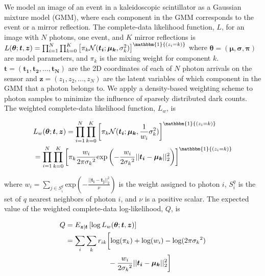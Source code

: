 We model an image of an event in a kaleidoscopic scintillator as a Gaussian 
mixture model (GMM), where each component in the GMM corresponds to the event or a 
mirror reflection.
The complete-data likelihood function, $L$, for an image with $N$ photons, 
one event, and $K$ mirror reflections is
$L(\bm{\theta};\bm{t},\bm{z})=\prod_{i=1}^N \prod_{k=0}^K \left[ \pi_k \mathcal{N}(\bm{t_i};\bm{\mu_k},\sigma_k^2) \right]^{\mathbbm{1}{(z_i=k)}}$
where $\bm{\theta}=(\bm{\mu},\bm{\sigma},\bm{\pi})$ are model parameters, 
and $\pi_k$ is the mixing weight for component $k$.
$\bm{t}=(\bm{t_1}, \bm{t_2}, ..., \bm{t_N})$ are the 2D coordinates of each of 
$N$ photon arrivals on the sensor and $\bm{z}=(z_1, z_2, ..., z_N)$ are the latent 
variables of which component in the GMM that a photon belongs to.
We apply a density-based weighting scheme to photon samples to minimize the 
influence of sparsely distributed dark counts.
The weighted complete-data likelihood function, $L_w$, is
\begin{linenomath}
\begin{align}
&L_w(\bm{\theta};\bm{t},\bm{z}) = \prod_{i=1}^N \prod_{k=0}^K \left[ \pi_k \mathcal{N}(\bm{t_i};\bm{\mu_k},\frac{1}{w_i}\sigma_k^2) \right]^{\mathbbm{1}{(z_i=k)}} \\
&= \prod_{i=1}^N \prod_{k=0}^K \left[ \pi_k \frac{w_i}{2\pi{\sigma_k}^2} \text{exp}\left( -\frac{w_i}{2{\sigma_k}^2} ||\bm{t_i}-\bm{\mu_k}||_2^2 \right) \right]^{\mathbbm{1}{(z_i=k)}}  \notag
\end{align}
\end{linenomath}
where
$w_i = \sum_{j \in S_i^q} \text{exp} \left( -\frac{||\bm{t_i}-\bm{t_j}||_2^2}{\nu} \right)$
is the weight assigned to photon $i$, $S_i^q$ is the set of $q$ 
nearest neighbors of photon $i$, and $\nu$ is a positive scalar.
The expected value of the weighted complete-data log-likelihood, $Q$, is
\begin{linenomath}
\begin{align} \label{eqn:Q_eqn}
Q & = E_{\bm{z}|\bm{t}}\left[\log L_w(\bm{\theta};\bm{t},\bm{z})\right] \\ & = \sum_i \sum_k r_{ik} \bigg[ \text{log}(\pi_k) + \text{log}(w_i) - \text{log}(2\pi{\sigma_k}^2) \notag \\ 
&\quad \quad \quad \quad \quad \quad - \frac{w_i}{2{\sigma_k}^2}||\bm{t_i}-\bm{\mu_k}||_2^2 \bigg] \notag
\end{align}
\end{linenomath}
